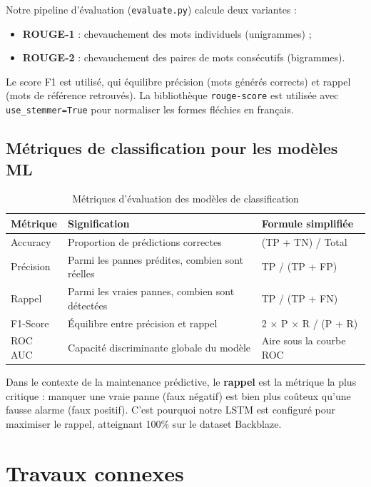 Notre pipeline d'évaluation (\texttt{evaluate.py}) calcule deux variantes :
\begin{itemize}
  \item \textbf{ROUGE-1} : chevauchement des mots individuels (unigrammes) ;
  \item \textbf{ROUGE-2} : chevauchement des paires de mots consécutifs (bigrammes).
\end{itemize}

Le score F1 est utilisé, qui équilibre précision (mots générés corrects) et rappel
(mots de référence retrouvés). La bibliothèque \texttt{rouge-score} est utilisée
avec \texttt{use\_stemmer=True} pour normaliser les formes fléchies en français.

\subsection{Métriques de classification pour les modèles ML}

\begin{table}[H]
\centering
\caption{Métriques d'évaluation des modèles de classification}
\begin{tabularx}{\textwidth}{|l|X|l|}
\hline
\rowcolor{lightblue}
\textbf{Métrique} & \textbf{Signification} & \textbf{Formule simplifiée} \\
\hline
Accuracy & Proportion de prédictions correctes & (TP + TN) / Total \\
\hline
Précision & Parmi les pannes prédites, combien sont réelles & TP / (TP + FP) \\
\hline
Rappel & Parmi les vraies pannes, combien sont détectées & TP / (TP + FN) \\
\hline
F1-Score & Équilibre entre précision et rappel & 2 $\times$ P $\times$ R / (P + R) \\
\hline
ROC AUC & Capacité discriminante globale du modèle & Aire sous la courbe ROC \\
\hline
\end{tabularx}
\end{table}

Dans le contexte de la maintenance prédictive, le \textbf{rappel} est la métrique
la plus critique : manquer une vraie panne (faux négatif) est bien plus coûteux
qu'une fausse alarme (faux positif). C'est pourquoi notre LSTM est configuré pour
maximiser le rappel, atteignant 100\% sur le dataset Backblaze.

\section{Travaux connexes}


